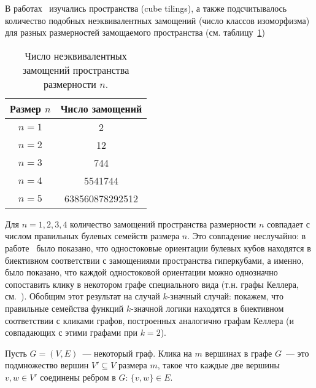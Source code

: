     В работах~\cite{sikiric2007cube, mathew2013enumerating} изучались  пространства (cube tilings), а также подсчитывалось количество подобных неэквивалентных замощений (число классов изоморфизма) для разных размерностей замощаемого пространства (см. таблицу~\ref{tab:counttilings})
    \begin{table}[h]
        \centering
        \captionsetup{justification=centering} %
        \caption{\label{tab:counttilings} Число неэквивалентных замощений пространства размерности $n$.}
        \begin{tabular}{|c|c|}
            \toprule
            Размер $n$  & Число замощений \\
            \midrule
            $n = 1$ & 2 \\
            \midrule
            $n = 2$ & 12 \\
            \midrule
            $n = 3$ & 744 \\
            \midrule
            $n = 4$ & 5541744 \\
            \midrule
            $n = 5$ & 638560878292512 \\
            \bottomrule
        \end{tabular}
    \end{table}
    
    Для $n = 1,2,3,4$ количество замощений пространства размерности $n$ совпадает с числом правильных булевых семейств размера $n$.
    Это совпадение неслучайно: в работе~\cite{borzechowski2022universal} было показано, что одностоковые ориентации булевых кубов находятся в биективном соответствии с замощениями пространства гиперкубами, а именно, было показано, что каждой одностоковой ориентации можно однозначно сопоставить клику в некотором графе специального вида (т.н. графы Келлера, см.~\cite{corradi1990combinatorial}).
    Обобщим этот результат на случай $k$-значный случай: покажем, что правильные семейства функций $k$-значной логики находятся в биективном соответствии с кликами графов, построенных аналогично графам Келлера (и совпадающих с этими графами при $k = 2$).

    \begin{definition}
        Пусть $G = (V, E)$~--- некоторый граф.
        Клика на $m$ вершинах в графе $G$~--- это подмножество вершин $V' \subseteq V$ размера $m$, такое что каждые две вершины $v, w \in V'$ соединены ребром в $G$: $\{v, w\} \in E$.
    \end{definition}

